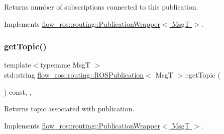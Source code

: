 Returns number of subscriptions connected to this publication. 



Implements \hyperlink{classflow__ros_1_1routing_1_1_publication_wrapper_a3e2fb2a4cafe729a643af5ed5033dc50}{flow\+\_\+ros\+::routing\+::\+Publication\+Wrapper$<$ Msg\+T $>$}.

\mbox{\label{classflow__ros_1_1routing_1_1_r_o_s_publication_a283e0832b79e8b1167d5e46bcde49c0b}} 
\subsubsection{\texorpdfstring{get\+Topic()}{getTopic()}}
{\footnotesize\ttfamily template$<$typename MsgT $>$ \\
std\+::string \hyperlink{classflow__ros_1_1routing_1_1_r_o_s_publication}{flow\+\_\+ros\+::routing\+::\+R\+O\+S\+Publication}$<$ MsgT $>$\+::get\+Topic (\begin{DoxyParamCaption}{ }\end{DoxyParamCaption}) const\hspace{0.3cm}{\ttfamily [inline]}, {\ttfamily [override]}, {\ttfamily [virtual]}}



Returns topic associated with publication. 



Implements \hyperlink{classflow__ros_1_1routing_1_1_publication_wrapper_a1aa441bb1846211cb803362233d4ee0b}{flow\+\_\+ros\+::routing\+::\+Publication\+Wrapper$<$ Msg\+T $>$}.

\mbox{\label{classflow__ros_1_1routing_1_1_r_o_s_publication_a2f2f880c127e4115d7edb85fb7faa067}} 
